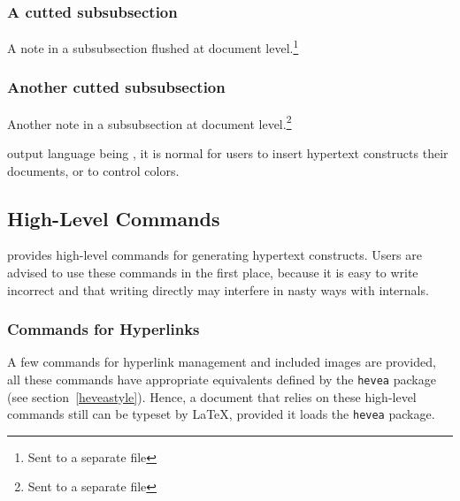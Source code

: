\subsubsection{A cutted subsubsection}
A note in a subsubsection flushed at document level.\footnote{Sent to a
separate file}
\subsubsection{Another cutted subsubsection}
Another note in a subsubsection at document level.\footnote{Sent to
a separate file}
%
\cutend
\fi

\hevea{} output language being \html{}, it is normal for users to insert
hypertext constructs their documents, or to control colors.

\subsection{High-Level Commands}
\hevea{} provides high-level commands for generating
hypertext constructs.
Users are advised to use these commands in the first place,
because it is easy to write incorrect \html{} and that writing
\html{} directly may interfere in nasty ways with \hevea{} internals.


\subsubsection{Commands for Hyperlinks}\label{hyperlink}
A few commands for hyperlink  management and included images
are provided, all these
commands have appropriate equivalents defined by the \texttt{hevea}
package (see section~\ref{heveastyle}).
Hence, a document that relies on these high-level commands
still can be typeset by \LaTeX{}, provided it loads the \texttt{hevea}
package.

